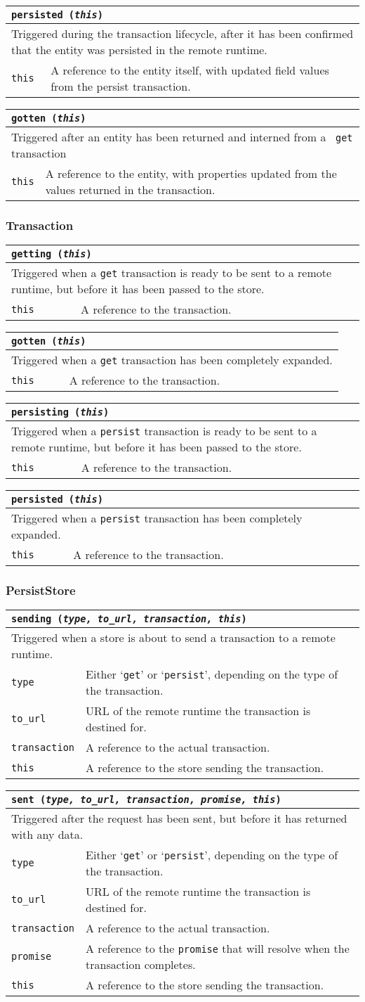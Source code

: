 \documentclass{article}
\newcommand{\ilcode}{\tt}
\newcommand{\method}[4]{
	\noindent
	\begin{tabular}{ | l | p{5in} | }
	\hline
	\multicolumn{2}{|l|}{\large \ilcode #1 ({\it #2})} \\
	\hline
	\multicolumn{2}{|p{6in}|}{#3} \\
	\hline
	#4
	\end{tabular}
}
\newcommand{\param}[2]{
	{\ilcode #1} & #2 \\
	\hline
}
\newcommand{\event}[4]{\method{#1}{#2}{#3}{#4}}
\begin{document}
\event{persisted}{this}
	{Triggered during the transaction lifecycle, after it has been confirmed
	that the entity was persisted in the remote runtime.}
	{\param{this}{A reference to the entity itself, with updated field values
	from the persist transaction.}}

\event{gotten}{this}
	{Triggered after an entity has been returned and interned from a {\ilcode
	get} transaction}
	{\param{this}{A reference to the entity, with properties updated from the
	values returned in the transaction.}}

\subsubsection{Transaction}
\event{getting}{this}
	{Triggered when a {\ilcode get} transaction is ready to be sent to a remote
	runtime, but before it has been passed to the store.}
	{\param{this}{A reference to the transaction.}}

\event{gotten}{this}
	{Triggered when a {\ilcode get} transaction has been completely expanded.}
	{\param{this}{A reference to the transaction.}}

\event{persisting}{this}
	{Triggered when a {\ilcode persist} transaction is ready to be sent to a
	remote runtime, but before it has been passed to the store.}
	{\param{this}{A reference to the transaction.}}

\event{persisted}{this}
	{Triggered when a {\ilcode persist} transaction has been completely
	expanded.}
	{\param{this}{A reference to the transaction.}}

\subsubsection{PersistStore}
\event{sending}{type, to\_url, transaction, this}
	{Triggered when a store is about to send a transaction to a remote runtime.}
	{
		\param{type}{Either `{\ilcode get}' or `{\ilcode persist}', depending on
			the type of the transaction.}
		\param{to\_url}{URL of the remote runtime the transaction is destined
			for.}
		\param{transaction}{A reference to the actual transaction.}
		\param{this}{A reference to the store sending the transaction.}
	}

\event{sent}{type, to\_url, transaction, promise, this}
	{Triggered after the request has been sent, but before it has returned with
		any data.}
	{
		\param{type}{Either `{\ilcode get}' or `{\ilcode persist}', depending on
			the type of the transaction.}
		\param{to\_url}{URL of the remote runtime the transaction is destined
			for.}
		\param{transaction}{A reference to the actual transaction.}
		\param{promise}{A reference to the {\ilcode promise} that will resolve
			when the transaction completes.}
		\param{this}{A reference to the store sending the transaction.}
	}
\end{document}
